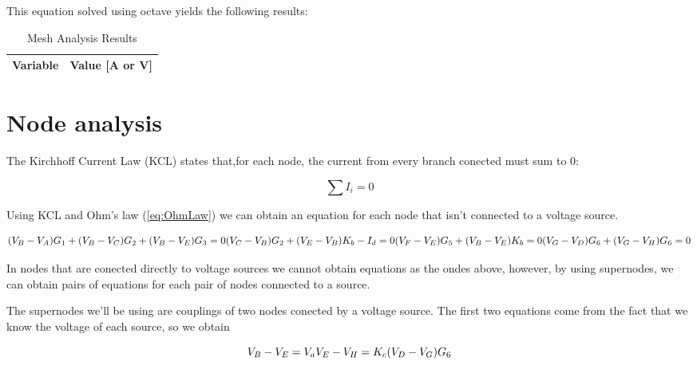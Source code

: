 This equation solved using octave yields the following results:

\begin{table}[h]
    \centering
    \begin{tabular}{|l|r|}
      \hline    
      {\bf Variable} & {\bf Value [A or V]} \\ \hline
      
    \end{tabular}
    \caption{Mesh Analysis Results}
    \label{tab:meshA}
  \end{table}

\section{Node analysis}
The Kirchhoff Current Law (KCL) states that,for each node, the current from every branch conected must sum to 0:

\begin{equation}
  \sum I_i = 0
  \label{eq:KCL}
\end{equation}


Using KCL and Ohm's law (\ref{eq:OhmLaw}) we can obtain an equation for each node that isn't connected to a voltage source.

\begin{equation}
    
  (V_B-V_A)G_1+(V_B-V_C)G_2+(V_B-V_E)G_3=0\\
  
  (V_C-V_B)G_2+(V_E-V_B)K_b-I_d=0\\
  
  (V_F-V_E)G_5+(V_B-V_E)K_b=0\\
  
  (V_G-V_D)G_6+(V_G-V_H)G_6=0

  \label{eq:nodos}
\end{equation}


In nodes that are conected directly to voltage sources we cannot obtain equations as the ondes above, however, by using supernodes, we can obtain pairs of equations for each pair of nodes connected to a source.
\par
The supernodes we'll be using are couplings of two nodes conected by a voltage source. The first two equations come from the fact that we know the voltage of each source, so we obtain

 \begin{equation}
  V_B-V_E=V_a\\
  
  V_E-V_H=K_c(V_D-V_G)G_6
  \label{eq:supenodosV}
\end{equation}

